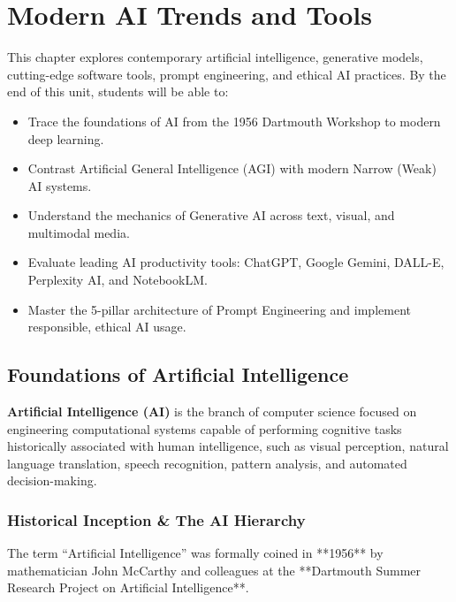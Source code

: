 \chapter{Modern AI Trends and Tools}
\label{chap:modern_ai}

\begin{tcolorbox}[enhanced, colback=boxnavybg, colframe=brandnavy, boxrule=1.2pt, arc=4pt, title={\Large\bfseries\sffamily Unit 6 Overview \& Learning Objectives}]
\sffamily\normalsize
This chapter explores contemporary artificial intelligence, generative models, cutting-edge software tools, prompt engineering, and ethical AI practices. By the end of this unit, students will be able to:
\begin{itemize}[leftmargin=1.2em, itemsep=2pt, topsep=3pt]
    \item Trace the foundations of AI from the 1956 Dartmouth Workshop to modern deep learning.
    \item Contrast Artificial General Intelligence (AGI) with modern Narrow (Weak) AI systems.
    \item Understand the mechanics of Generative AI across text, visual, and multimodal media.
    \item Evaluate leading AI productivity tools: ChatGPT, Google Gemini, DALL-E, Perplexity AI, and NotebookLM.
    \item Master the 5-pillar architecture of Prompt Engineering and implement responsible, ethical AI usage.
\end{itemize}
\end{tcolorbox}

\section{Foundations of Artificial Intelligence}

\textbf{Artificial Intelligence (AI)} is the branch of computer science focused on engineering computational systems capable of performing cognitive tasks historically associated with human intelligence, such as visual perception, natural language translation, speech recognition, pattern analysis, and automated decision-making.

\subsection{Historical Inception \& The AI Hierarchy}
The term ``Artificial Intelligence'' was formally coined in **1956** by mathematician John McCarthy and colleagues at the **Dartmouth Summer Research Project on Artificial Intelligence**.

